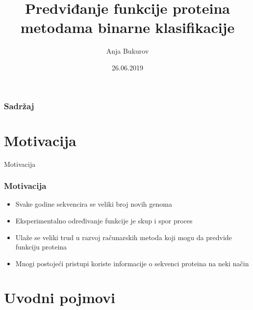 \documentclass{beamer}
\title{Predviđanje funkcije proteina metodama binarne klasifikacije}
\author{Anja Bukurov}
\institute{Matematički fakultet}
\date{26.06.2019}
\begin{document}
 
\frame{\titlepage}

 
\begin{frame}
	\frametitle{Sadržaj}
	\tableofcontents
\end{frame}


\section{Motivacija}
\begin{frame}{Motivacija}
	\frametitle{Motivacija}

	\begin{itemize}
		\item Svake godine sekvencira se veliki broj novih genoma
		
		\item Eksperimentalno određivanje funkcije je skup i spor proces
		
		\item Ulaže se veliki trud u razvoj računarskih metoda koji mogu da predvide funkciju proteina
		
		\item Mnogi postojeći pristupi koriste informacije o sekvenci proteina na neki način
		
		
	\end{itemize}

\end{frame}
 

\section{Uvodni pojmovi}
\end{document}
